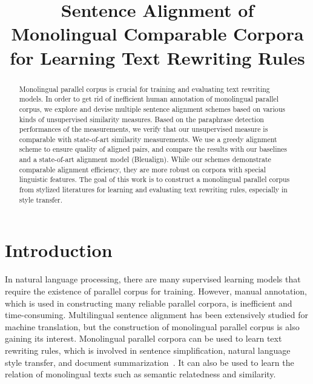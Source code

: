 \documentclass[runningheads]{llncs}
\begin{document}
	
\renewcommand\arraystretch{1.5}
%
\title{Sentence Alignment of Monolingual Comparable Corpora for Learning Text Rewriting Rules}
%
%
%
%
%
\maketitle              %
%
\begin{abstract}
Monolingual parallel corpus is crucial for training and evaluating text rewriting models. In order to get rid of inefficient human annotation of monolingual parallel corpus, we explore and devise multiple sentence alignment schemes based on various kinds of unsupervised similarity measures. Based on the paraphrase detection performances of the measurements, we verify that our unsupervised measure is comparable with state-of-art similarity measurements. We use a greedy alignment scheme to ensure quality of aligned pairs, and compare the results with our baselines and a state-of-art alignment model (Bleualign). While our schemes demonstrate comparable alignment efficiency, they are more robust on corpora with special linguistic features. The goal of this work is to construct a monolingual parallel corpus from stylized literatures for learning and evaluating text rewriting rules, especially in style transfer.

\end{abstract}
%
%
%
\section{Introduction}
\label{sec:intro}

In natural language processing, there are many supervised learning models that require the existence of parallel corpus for training. However, manual annotation, which is used in constructing many reliable parallel corpora, is inefficient and time-consuming. Multilingual sentence alignment has been extensively studied for machine translation, but the construction of monolingual parallel corpus is also gaining its interest. Monolingual parallel corpora can be used to learn text rewriting rules, which is involved in sentence simplification, natural language style transfer, and document summarization~\cite{hwang2015aligning}. It can also be used to learn the relation of monolingual texts such as semantic relatedness and similarity.
\end{document}
